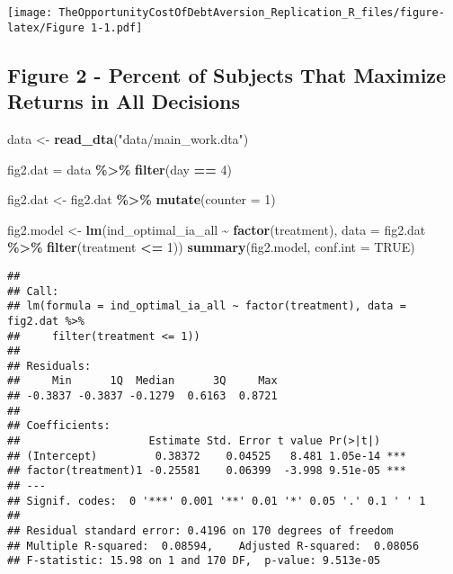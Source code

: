 \documentclass[
]{article}
\newenvironment{Shaded}{\begin{snugshade}}{\end{snugshade}}
\newcommand{\AttributeTok}[1]{\textcolor[rgb]{0.13,0.29,0.53}{#1}}
\newcommand{\ConstantTok}[1]{\textcolor[rgb]{0.56,0.35,0.01}{#1}}
\newcommand{\DecValTok}[1]{\textcolor[rgb]{0.00,0.00,0.81}{#1}}
\newcommand{\FunctionTok}[1]{\textcolor[rgb]{0.13,0.29,0.53}{\textbf{#1}}}
\newcommand{\NormalTok}[1]{#1}
\newcommand{\OtherTok}[1]{\textcolor[rgb]{0.56,0.35,0.01}{#1}}
\newcommand{\SpecialCharTok}[1]{\textcolor[rgb]{0.81,0.36,0.00}{\textbf{#1}}}
\newcommand{\StringTok}[1]{\textcolor[rgb]{0.31,0.60,0.02}{#1}}
\begin{document}
\texttt{[image: TheOpportunityCostOfDebtAversion\_Replication\_R\_files/figure-latex/Figure 1-1.pdf]}

\subsection{Figure 2 - Percent of Subjects That Maximize Returns in All
Decisions}\label{figure-2---percent-of-subjects-that-maximize-returns-in-all-decisions}

\begin{Shaded}
\begin{Highlighting}[]
\NormalTok{data }\OtherTok{\textless{}{-}} \FunctionTok{read\_dta}\NormalTok{(}\StringTok{"data/main\_work.dta"}\NormalTok{)}

\NormalTok{fig2.dat }\OtherTok{=}\NormalTok{ data }\SpecialCharTok{\%\textgreater{}\%}
  \FunctionTok{filter}\NormalTok{(day }\SpecialCharTok{==} \DecValTok{4}\NormalTok{)}

\NormalTok{fig2.dat }\OtherTok{\textless{}{-}}\NormalTok{ fig2.dat }\SpecialCharTok{\%\textgreater{}\%}
  \FunctionTok{mutate}\NormalTok{(}\AttributeTok{counter =} \DecValTok{1}\NormalTok{)}

\NormalTok{fig2.model }\OtherTok{\textless{}{-}} \FunctionTok{lm}\NormalTok{(ind\_optimal\_ia\_all }\SpecialCharTok{\textasciitilde{}} \FunctionTok{factor}\NormalTok{(treatment), }\AttributeTok{data =}\NormalTok{ fig2.dat }\SpecialCharTok{\%\textgreater{}\%} \FunctionTok{filter}\NormalTok{(treatment }\SpecialCharTok{\textless{}=} \DecValTok{1}\NormalTok{))}
\FunctionTok{summary}\NormalTok{(fig2.model, }\AttributeTok{conf.int =} \ConstantTok{TRUE}\NormalTok{)}
\end{Highlighting}
\end{Shaded}

\begin{verbatim}
## 
## Call:
## lm(formula = ind_optimal_ia_all ~ factor(treatment), data = fig2.dat %>% 
##     filter(treatment <= 1))
## 
## Residuals:
##     Min      1Q  Median      3Q     Max 
## -0.3837 -0.3837 -0.1279  0.6163  0.8721 
## 
## Coefficients:
##                    Estimate Std. Error t value Pr(>|t|)    
## (Intercept)         0.38372    0.04525   8.481 1.05e-14 ***
## factor(treatment)1 -0.25581    0.06399  -3.998 9.51e-05 ***
## ---
## Signif. codes:  0 '***' 0.001 '**' 0.01 '*' 0.05 '.' 0.1 ' ' 1
## 
## Residual standard error: 0.4196 on 170 degrees of freedom
## Multiple R-squared:  0.08594,    Adjusted R-squared:  0.08056 
## F-statistic: 15.98 on 1 and 170 DF,  p-value: 9.513e-05
\end{verbatim}
\end{document}
